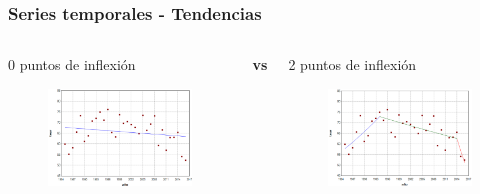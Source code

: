 \documentclass{beamer}
\begin{document}
\begin{frame}\frametitle{Series temporales - Tendencias}
	\begin{columns}
		\begin{column}{0.5\textwidth}
			\centering \normalsize 0 puntos de inflexión
			\begin{figure}
				\includegraphics[width=\textwidth]{images/jpo0.png}
			\end{figure}
			
		\end{column}
		\large{\textbf{vs}}
		\begin{column}{0.5\textwidth}
			\centering \normalsize 2 puntos de inflexión
			\begin{figure}
				\centering
				\includegraphics[width=\textwidth]{images/jpo2.png}
			\end{figure}
		\end{column}
	\end{columns}


\end{frame}
\end{document}
